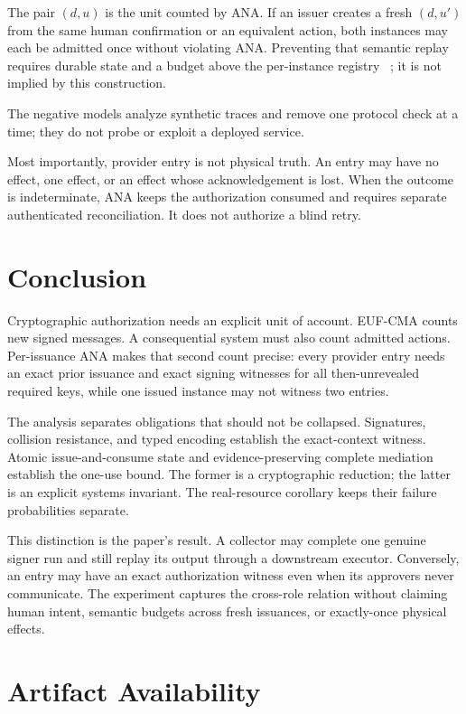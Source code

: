 \documentclass[10pt]{article}
\begin{document}
The pair $(d,u)$ is the unit counted by ANA. If an issuer creates a fresh
$(d,u')$ from the same human confirmation or an equivalent action, both instances
may each be admitted once without violating ANA. Preventing that semantic replay
requires durable state and a budget above the per-instance registry
~\cite{caplease26}; it is not implied by this construction.

The negative models analyze synthetic traces and remove one protocol check at a
time; they do not probe or exploit a deployed service.

Most importantly, provider entry is not physical truth. An entry may have no
effect, one effect, or an effect whose acknowledgement is lost. When the outcome
is indeterminate, ANA keeps the authorization consumed and requires separate
authenticated reconciliation. It does not authorize a blind retry.

\section{Conclusion}

Cryptographic authorization needs an explicit unit of account. EUF-CMA counts
new signed messages. A consequential system must also count admitted actions.
Per-issuance ANA makes that second count precise: every provider entry needs an
exact prior issuance and exact signing witnesses for all then-unrevealed
required keys, while one issued instance may not witness two entries.

The analysis separates obligations that should not be collapsed. Signatures,
collision resistance, and typed encoding establish the exact-context witness.
Atomic issue-and-consume state and evidence-preserving complete mediation
establish the one-use bound. The former is a cryptographic reduction; the
latter is an explicit systems invariant. The real-resource corollary keeps
their failure probabilities separate.

This distinction is the paper's result. A collector may complete one genuine
signer run and still replay its output through a downstream executor. Conversely,
an entry may have an exact authorization witness even when its approvers never
communicate. The experiment captures the cross-role relation without claiming
human intent, semantic budgets across fresh issuances, or exactly-once physical
effects.

\section*{Artifact Availability}
\end{document}
